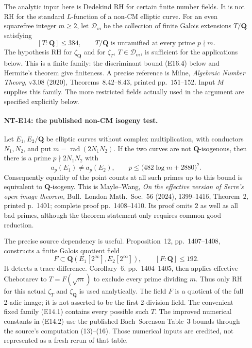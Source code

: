 The analytic input here is Dedekind RH for certain finite
number fields. It is not RH for the standard $L$-function
of a non-CM elliptic curve.
For an even squarefree integer $m\ge2$, let
$\mathcal D_m$ be the collection of finite Galois
extensions $T/\mathbf Q$ satisfying
\[
 [T:\mathbf Q]\le384,\qquad
 T/\mathbf Q\text{ is unramified at every prime }p\nmid m.
 \tag{E14.1}
\]
The hypothesis RH for $\zeta_{\mathbf Q}$ and for
$\zeta_T$, $T\in\mathcal D_m$, is sufficient for the
applications below. This is a finite family: the
discriminant bound (E16.4) below and Hermite's theorem
give finiteness. A precise reference is Milne,
\emph{Algebraic Number Theory}, v3.08 (2020),
Theorems~8.42--8.43, printed pp.~151--152.
Input $M$ supplies this family.
The more restricted fields actually used in the
argument are specified explicitly below.

\paragraph{NT-E14: the published non-CM isogeny test.}
Let $E_1,E_2/\mathbf Q$ be elliptic curves without
complex multiplication, with conductors $N_1,N_2$,
and put $m=\operatorname{rad}(2N_1N_2)$.
If the two curves are not $\mathbf Q$-isogenous,
then there is a prime $p\nmid2N_1N_2$ with
\[
 a_p(E_1)\ne a_p(E_2),\qquad
 p\le \bigl(482\log m+2880\bigr)^2.
 \tag{E14.2}
\]
Consequently equality of the point counts at all
such primes up to this bound is equivalent to
$\mathbf Q$-isogeny.
This is Mayle--Wang, \emph{On the effective version
of Serre's open image theorem},
Bull.\ London Math.\ Soc.~56 (2024), 1399--1416,
Theorem~2, printed p.~1401; complete proof
pp.~1408--1410. Its proof omits $2$ as well as all
bad primes, although the theorem statement only
requires common good reduction.

The precise source dependency is useful. Proposition~12,
pp.~1407--1408, constructs a finite Galois quotient field
\[
 F\subset\mathbf Q(E_1[2^\infty],E_2[2^\infty]),
                      \qquad [F:\mathbf Q]\le192.
 \tag{E14.3}
\]
It detects a trace difference. Corollary~6,
pp.~1404--1405, then applies effective Chebotarev to
$T=F(\sqrt m)$ to exclude every prime dividing $m$.
Thus only RH for this actual $\zeta_T$ and
$\zeta_{\mathbf Q}$ is used analytically.
The field $F$ is a quotient of the full $2$-adic image;
it is not asserted to be the first $2$-division field.
The convenient fixed family (E14.1) contains every
possible such $T$. The improved numerical constants
in (E14.2) use the published Bach--Sorenson Table~3
bounds through the source's computation
(13)--(16). Those numerical inputs are credited,
not represented as a fresh rerun of that table.

